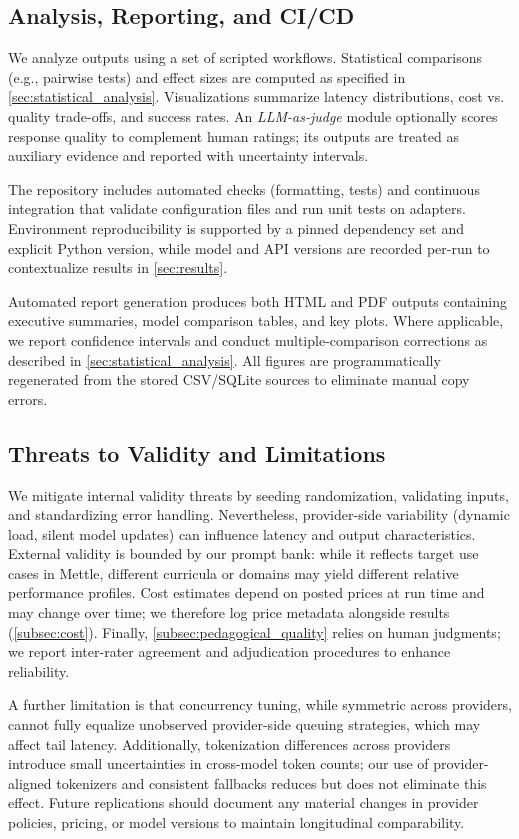 \subsection{Analysis, Reporting, and CI/CD}
\label{subsec:analysis_reporting}

We analyze outputs using a set of scripted workflows. Statistical comparisons (e.g., pairwise tests) and effect sizes are computed as specified in \cref{sec:statistical_analysis}. Visualizations summarize latency distributions, cost vs. quality trade-offs, and success rates. An \textit{LLM-as-judge} module optionally scores response quality to complement human ratings; its outputs are treated as auxiliary evidence and reported with uncertainty intervals.

The repository includes automated checks (formatting, tests) and continuous integration that validate configuration files and run unit tests on adapters. Environment reproducibility is supported by a pinned dependency set and explicit Python version, while model and API versions are recorded per-run to contextualize results in \cref{sec:results}.

Automated report generation produces both HTML and PDF outputs containing executive summaries, model comparison tables, and key plots. Where applicable, we report confidence intervals and conduct multiple-comparison corrections as described in \cref{sec:statistical_analysis}. All figures are programmatically regenerated from the stored CSV/SQLite sources to eliminate manual copy errors.

\subsection{Threats to Validity and Limitations}
\label{subsec:threats_limitations}

We mitigate internal validity threats by seeding randomization, validating inputs, and standardizing error handling. Nevertheless, provider-side variability (dynamic load, silent model updates) can influence latency and output characteristics. External validity is bounded by our prompt bank: while it reflects target use cases in Mettle, different curricula or domains may yield different relative performance profiles. Cost estimates depend on posted prices at run time and may change over time; we therefore log price metadata alongside results (\cref{subsec:cost}). Finally, \cref{subsec:pedagogical_quality} relies on human judgments; we report inter-rater agreement and adjudication procedures to enhance reliability.

A further limitation is that concurrency tuning, while symmetric across providers, cannot fully equalize unobserved provider-side queuing strategies, which may affect tail latency. Additionally, tokenization differences across providers introduce small uncertainties in cross-model token counts; our use of provider-aligned tokenizers and consistent fallbacks reduces but does not eliminate this effect. Future replications should document any material changes in provider policies, pricing, or model versions to maintain longitudinal comparability.
